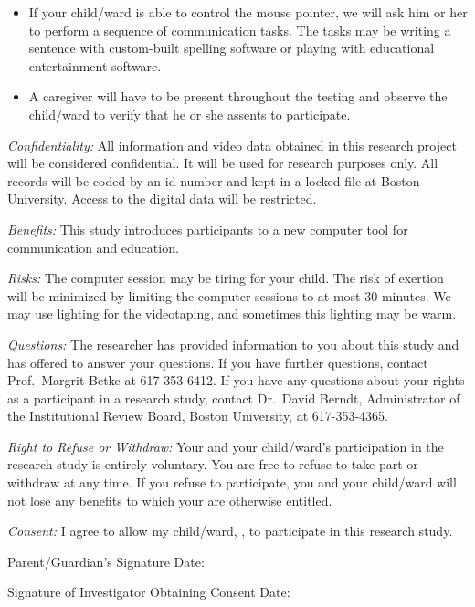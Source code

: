 \begin{letter}
\begin{itemize}
\item If your child/ward is able to control the mouse pointer, we will
ask him or her to perform a sequence of communication tasks.  The
tasks may be writing a sentence with custom-built spelling software or
playing with educational entertainment software.

\item A caregiver will have to be present throughout the testing and
observe the child/ward to verify that he or she assents to
participate.

\end{itemize}

{\em Confidentiality:} All information and video data obtained in this
research project will be considered confidential.  It will be used for
research purposes only.  All records will be coded by an id number and
kept in a locked file at Boston University.  Access to the digital
data will be restricted.

{\em Benefits:} This study introduces participants to a new computer
tool for communication and education.

{\em Risks:} The computer session may be tiring for your child.  The
risk of exertion will be minimized by limiting the computer sessions
to at most 30 minutes. We may use lighting for the videotaping, and sometimes this
lighting may be warm.

{\em Questions:} The researcher has provided information to you about
this study and has offered to answer your questions.  If you have
further questions, contact Prof.\ Margrit Betke at 617-353-6412.  If
you have any questions about your rights as a participant in a
research study, contact Dr.\ David Berndt, Administrator of the
Institutional Review Board, Boston University, at 617-353-4365.

{\em Right to Refuse or Withdraw:} Your and your child/ward's
participation in the research study is entirely voluntary.  You are
free to refuse to take part or withdraw at any time.  If you refuse to
participate, you and your child/ward will not lose any benefits to
which your are otherwise entitled.

{\em Consent:} I agree to allow my child/ward, \hrulefill, to
participate in this research study.

Parent/Guardian's Signature \hrulefill  Date: \hrulefill

Signature of Investigator Obtaining Consent \hrulefill  Date: \hrulefill

\end{letter}

 